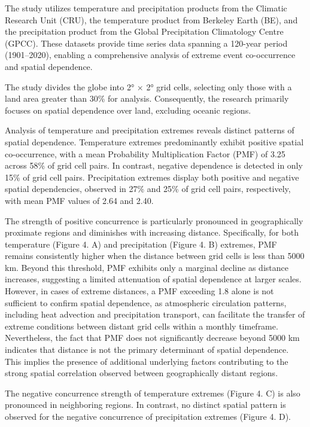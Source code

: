 \documentclass[
]{krantz}
\begin{document}
The study utilizes temperature and precipitation products from the Climatic Research Unit (CRU), the temperature product from Berkeley Earth (BE), and the precipitation product from the Global Precipitation Climatology Centre (GPCC). These datasets provide time series data spanning a 120-year period (1901--2020), enabling a comprehensive analysis of extreme event co-occurrence and spatial dependence.

The study divides the globe into 2° × 2° grid cells, selecting only those with a land area greater than 30\% for analysis. Consequently, the research primarily focuses on spatial dependence over land, excluding oceanic regions.

Analysis of temperature and precipitation extremes reveals distinct patterns of spatial dependence. Temperature extremes predominantly exhibit positive spatial co-occurrence, with a mean Probability Multiplication Factor (PMF) of 3.25 across 58\% of grid cell pairs. In contrast, negative dependence is detected in only 15\% of grid cell pairs. Precipitation extremes display both positive and negative spatial dependencies, observed in 27\% and 25\% of grid cell pairs, respectively, with mean PMF values of 2.64 and 2.40.

The strength of positive concurrence is particularly pronounced in geographically proximate regions and diminishes with increasing distance. Specifically, for both temperature (Figure 4. A) and precipitation (Figure 4. B) extremes, PMF remains consistently higher when the distance between grid cells is less than 5000 km. Beyond this threshold, PMF exhibits only a marginal decline as distance increases, suggesting a limited attenuation of spatial dependence at larger scales. However, in cases of extreme distances, a PMF exceeding 1.8 alone is not sufficient to confirm spatial dependence, as atmospheric circulation patterns, including heat advection and precipitation transport, can facilitate the transfer of extreme conditions between distant grid cells within a monthly timeframe. Nevertheless, the fact that PMF does not significantly decrease beyond 5000 km indicates that distance is not the primary determinant of spatial dependence. This implies the presence of additional underlying factors contributing to the strong spatial correlation observed between geographically distant regions.

The negative concurrence strength of temperature extremes (Figure 4. C) is also pronounced in neighboring regions. In contrast, no distinct spatial pattern is observed for the negative concurrence of precipitation extremes (Figure 4. D).
\end{document}
